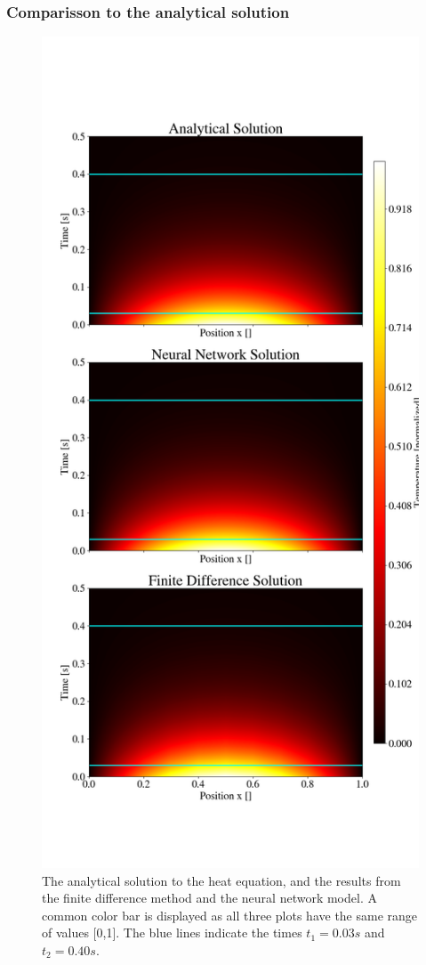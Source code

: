 \subsubsection{Comparisson to the analytical solution}
\begin{figure}[h!]
    \centering
    \includegraphics[width=1.0\linewidth]{project_3/plots/heat_map_comparison.png}
    \caption{The analytical solution to the heat equation, and the results from the finite difference method and the neural network model. A common color bar is displayed as all three plots have the same range of values [0,1]. The blue lines indicate the times $t_1 = 0.03 s$ and $t_2 = 0.40 s$.}
    \label{fig:heatmaps}
\end{figure}

